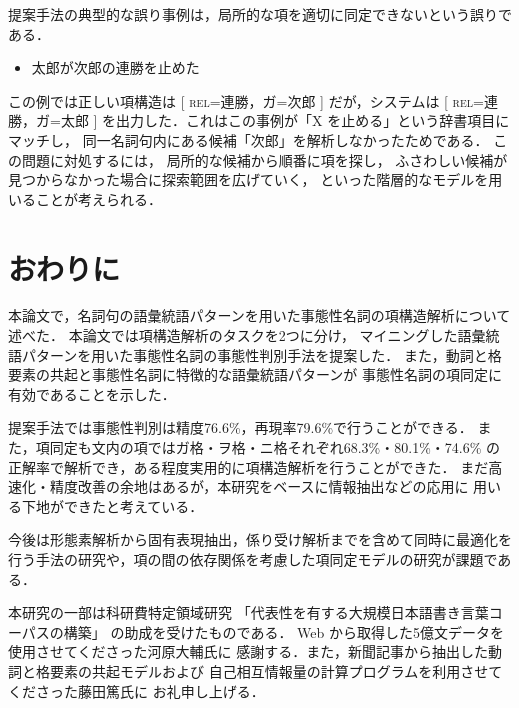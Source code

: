 \documentclass[japanese]{jnlp_1.4}
\begin{document}
提案手法の典型的な誤り事例は，局所的な項を適切に同定できないという誤りである．

\begin{itemize}
\item 太郎が次郎の連勝を止めた
\end{itemize}

この例では正しい項構造は
[ \textsc{rel}=連勝，ガ=次郎 ]
だが，システムは
[ \textsc{rel}=連勝，ガ=太郎 ]
を出力した．これはこの事例が「X を止める」という辞書項目にマッチし，
同一名詞句内にある候補「次郎」を解析しなかったためである．
この問題に対処するには，
局所的な候補から順番に項を探し，
ふさわしい候補が見つからなかった場合に探索範囲を広げていく，
といった階層的なモデルを用いることが考えられる．


\section{おわりに}

本論文で，名詞句の語彙統語パターンを用いた事態性名詞の項構造解析について述べた．
本論文では項構造解析のタスクを2つに分け，
マイニングした語彙統語パターンを用いた事態性名詞の事態性判別手法を提案した．
また，動詞と格要素の共起と事態性名詞に特徴的な語彙統語パターンが
事態性名詞の項同定に有効であることを示した．

提案手法では事態性判別は精度76.6\%，再現率79.6\%で行うことができる．
また，項同定も文内の項ではガ格・ヲ格・ニ格それぞれ68.3\%・80.1\%・74.6\%
の正解率で解析でき，ある程度実用的に項構造解析を行うことができた．
まだ高速化・精度改善の余地はあるが，本研究をベースに情報抽出などの応用に
用いる下地ができたと考えている．

今後は形態素解析から固有表現抽出，係り受け解析までを含めて同時に最適化を
行う手法の研究や，項の間の依存関係を考慮した項同定モデルの研究が課題である．


\acknowledgment

本研究の一部は科研費特定領域研究
「代表性を有する大規模日本語書き言葉コーパスの構築」
の助成を受けたものである．
Web から取得した5億文データを使用させてくださった河原大輔氏に
感謝する．また，新聞記事から抽出した動詞と格要素の共起モデルおよび
自己相互情報量の計算プログラムを利用させてくださった藤田篤氏に
お礼申し上げる．



\end{document}
